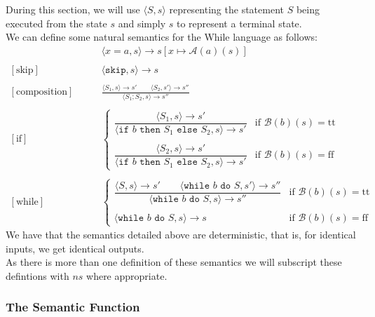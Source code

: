 During this section, we will use $\langle S, s\rangle$
representing the statement $S$ being executed from the state $s$ and
simply $s$ to represent a terminal state.
\\[\baselineskip]
We can define some natural semantics for the While language as follows:
\begin{align*}
  [\text{assignment}]& \qquad \langle x=a, s \rangle \to s[x\mapsto \mathcal{A}(a)(s)] \\ \\
  [\text{skip}]& \qquad \langle \texttt{skip}, s \rangle \to s \\ \\
  [\text{composition}]& \qquad \frac{
    \langle S_1, s \rangle \to s' \qquad \langle S_2, s' \rangle \to s''
  }{\langle S_1;S_2, s \rangle \to s''} \\ \\
  [\text{if}]& \qquad \begin{cases}
    \dfrac{
      \langle S_1, s \rangle \to s'
    }{
      \langle \texttt{if } b \texttt{ then } S_1 \texttt{ else } S_2, s \rangle \to s'
    } & \text{if } \mathcal{B}(b)(s) = \text{tt} \\ \\
    \dfrac{
      \langle S_2, s \rangle \to s'
    }{
      \langle \texttt{if } b \texttt{ then } S_1 \texttt{ else } S_2, s \rangle \to s'
    } & \text{if } \mathcal{B}(b)(s) = \text{ff}
  \end{cases} \\ \\
  [\text{while}]& \qquad \begin{cases}
    \dfrac{
      \langle S, s \rangle \to s' \qquad \langle 
      \texttt{while } b \texttt{ do } S, s' \rangle \to s''
    }{
      \langle \texttt{while } b \texttt{ do } S, s \rangle \to s''
    } & \text{if } \mathcal{B}(b)(s) = \text{tt} \\ \\
    \langle \texttt{while } b \texttt{ do } S, s \rangle \to s
    & \text{if } \mathcal{B}(b)(s) = \text{ff}
  \end{cases}
\end{align*} We have that the semantics detailed above are deterministic, that is,
for identical inputs, we get identical outputs.
\\[\baselineskip]
As there is more than one definition of these semantics
we will subscript these defintions with $ns$ where appropriate.

\subsubsection{The Semantic Function}

